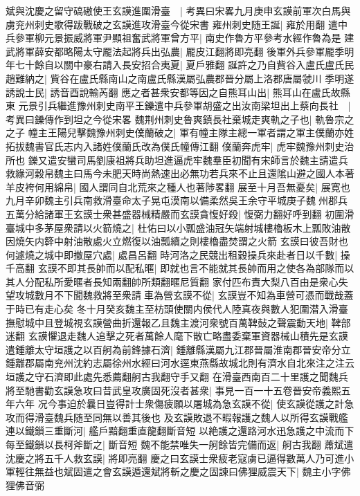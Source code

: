 斌與沈慶之留守碻磝使王玄謨進圍滑臺　|{
	考異曰宋畧九月庚申玄謨前軍次白馬與虜兖州刺史歌得跋戰破之玄謨進攻滑臺今從宋書}
雍州刺史随王誕|{
	雍於用翻}
遣中兵參軍柳元景振威將軍尹顯祖奮武將軍曾方平|{
	南史作魯方平參考水經作魯為是}
建武將軍薛安都略陽太守龎法起將兵出弘農|{
	龎皮江翻將即亮翻}
後軍外兵參軍龎季明年七十餘自以關中豪右請入長安招合夷夏|{
	夏戶雅翻}
誕許之乃自貲谷入盧氏盧氏民趙難納之|{
	貲谷在盧氏縣南山之南盧氏縣漢屬弘農郡晉分屬上洛郡唐屬虢川}
季明遂誘說士民|{
	誘音酉說輸芮翻}
應之者甚衆安都等因之自熊耳山出|{
	熊耳山在盧氏故縣東}
元景引兵繼進豫州刺史南平王鑠遣中兵參軍胡盛之出汝南梁坦出上蔡向長社　|{
	考異曰鑠傳作到坦之今從宋畧}
魏荆州刺史魯爽鎮長社棄城走爽軌之子也|{
	軌魯宗之之子}
幢主王陽兒擊魏豫州刺史僕蘭破之|{
	軍有幢主隊主總一軍者謂之軍主僕蘭亦姓拓拔魏書官氏志内入諸姓僕蘭氏改為僕氏幢傳江翻}
僕蘭奔虎牢|{
	虎牢魏豫州刺史治所也}
鑠又遣安蠻司馬劉康祖將兵助坦進逼虎牢魏羣臣初聞有宋師言於魏主請遣兵救緣河穀帛魏主曰馬今未肥天時尚熱速出必無功若兵來不止且還隂山避之國人本著羊皮袴何用綿帛|{
	國人謂同自北荒來之種人也著陟畧翻}
展至十月吾無憂矣|{
	展寛也}
九月辛卯魏主引兵南救滑臺命太子晃屯漠南以備柔然吳王余守平城庚子魏州郡兵五萬分給諸軍王玄謨士衆甚盛器械精嚴而玄謨貪愎好殺|{
	愎弼力翻好呼到翻}
初圍滑臺城中多茅屋衆請以火箭燒之|{
	杜佑曰以小瓢盛油冠矢端射城樓櫓板木上瓢敗油散因燒矢内簳中射油散處火立燃復以油瓢續之則樓櫓盡焚謂之火箭}
玄謨曰彼吾財也何遽燒之城中即撤屋穴處|{
	處昌呂翻}
時河洛之民競出租穀操兵來赴者日以千數|{
	操千高翻}
玄謨不即其長帥而以配私暱|{
	即就也言不能就其長帥而用之使各為部隊而以其人分配私所愛暱者長知兩翻帥所類翻暱尼質翻}
家付匹布責大梨八百由是衆心失望攻城數月不下聞魏救將至衆請車為營玄謨不從|{
	玄謨豈不知為車營可憑而戰哉蓋于時已有走心矣}
冬十月癸亥魏主至枋頭使關内侯代人陸真夜與數人犯圍潜入滑臺撫慰城中且登城視玄謨營曲折還報乙且魏主渡河衆號百萬鞞鼔之聲震動天地|{
	鞞部迷翻}
玄謨懼退走魏人追擊之死者萬餘人麾下散亡略盡委棄軍資器械山積先是玄謨遣鍾離太守垣護之以百舸為前鋒據石濟|{
	鍾離縣漢屬九江郡晉屬淮南郡晉安帝分立鍾離郡屬南兖州沈約志屬徐州水經曰河水逕東燕縣故城北則有濟水自北來注之注云垣護之守石濟即此處先悉薦翻舸古我翻守手又翻}
在滑臺西南百二十里護之聞魏兵將至馳書勸玄謨急攻曰昔武皇攻廣固死沒者甚衆|{
	事見一百一十五卷晉安帝義熙五年六年}
况今事迫於曩日豈得計士衆傷疲願以屠城為急玄謨不從|{
	使玄謨從護之計急攻而得滑臺魏兵随至同無以善其後也}
及玄謨敗退不暇報護之魏人以所得玄謨戰艦連以鐵鎻三重斷河|{
	艦戶黯翻重直龍翻斷音短}
以絶護之還路河水迅急護之中流而下每至鐵鎖以長柯斧斷之|{
	斷音短}
魏不能禁唯失一舸餘皆完備而返|{
	舸古我翻}
蕭斌遣沈慶之將五千人救玄謨|{
	將即亮翻}
慶之曰玄謨士衆疲老寇虜已逼得數萬人乃可進小軍輕往無益也斌固遣之會玄謨遁還斌將斬之慶之固諫曰佛狸威震天下|{
	魏主小字佛狸佛音弼}
